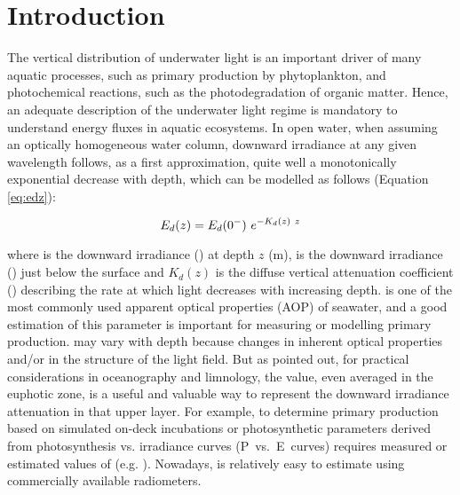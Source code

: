 \section{Introduction}

The vertical distribution of underwater light is an important driver of many aquatic processes, such as primary production by phytoplankton, and photochemical reactions, such as the photodegradation of organic matter. Hence, an adequate description of the underwater light regime is mandatory to understand energy fluxes in aquatic ecosystems. In open water, when assuming an optically homogeneous water column, downward irradiance at any given wavelength follows, as a first approximation, quite well a monotonically exponential decrease with depth, which can be modelled as follows \citep{Kirk1994} (Equation \ref{eq:edz}):

\begin{equation}
    {E_d(z)}{} = {E_d(0^-)}{}~e^{-K_{d}(z)~z}
    \label{eq:edz}
\end{equation}

\noindent where \edz{} is the downward irradiance (\wmsquare{}) at depth $z$ (m), \edzero{} is the downward irradiance (\wmsquare{}) just below the surface and $K_d(z)$ is the diffuse vertical attenuation coefficient (\mminus{}) describing the rate at which light decreases with increasing depth. \ked{} is one of the most commonly used apparent optical properties (AOP) of seawater, and a good estimation of this parameter is important for measuring or modelling primary production. \ked{} may vary with depth because changes in inherent optical properties and/or in the structure of the light field. But as \citet{Kirk1994} pointed out, for practical considerations in oceanography and limnology, the \ked{} value, even averaged in the euphotic zone, is a useful and valuable way to represent the downward irradiance attenuation in that upper layer. For example, to determine primary production based on simulated on-deck incubations or photosynthetic parameters derived from photosynthesis vs. irradiance curves (P~vs.~E~curves) requires measured or estimated values of \ked{} (e.g. \citet{Morel1996}). Nowadays, \ked{} is relatively easy to estimate using commercially available radiometers.


